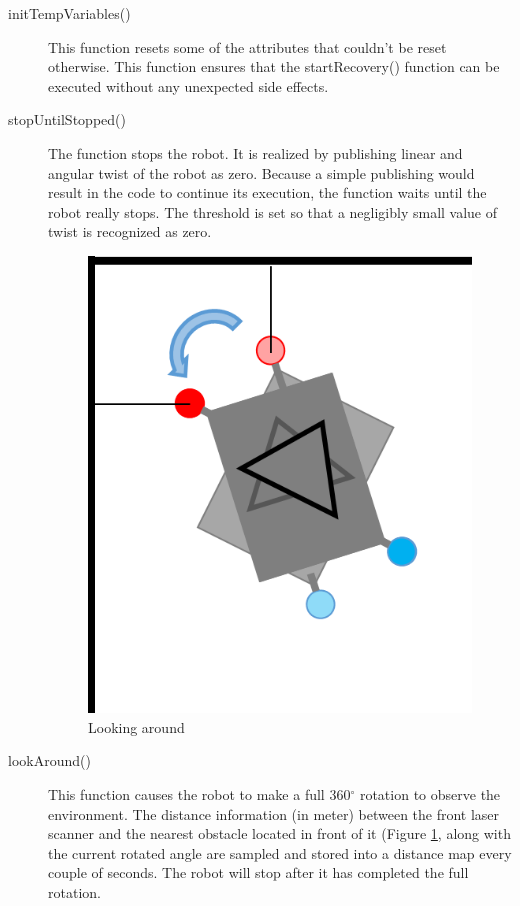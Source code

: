 \begin{description}
\item[initTempVariables()] This function resets some of the attributes that couldn't be reset otherwise. This function ensures that the startRecovery() function can be executed without any unexpected side effects.

\item[stopUntilStopped()] The function stops the robot. It is realized by publishing linear and angular twist of the robot as zero. Because a simple publishing would result in the code to continue its execution, the function waits until the robot really stops. The threshold is set so that a negligibly small value of twist is recognized as zero.

\begin{figure}[htb]
\centering
\includegraphics[scale=0.5]{graphics/find_best_angle.png}
\caption{Looking around}
\label{best}
\centering
\end{figure}

\item[lookAround()] This function causes the robot to make a full 360$^{\circ}$ rotation to observe the environment. The distance information (in meter) between the front laser scanner and the nearest obstacle located in front of it (Figure \ref{best}, along with the current rotated angle are sampled and stored into a distance map every couple of seconds. The robot will stop after it has completed the full rotation.


\end{description}

